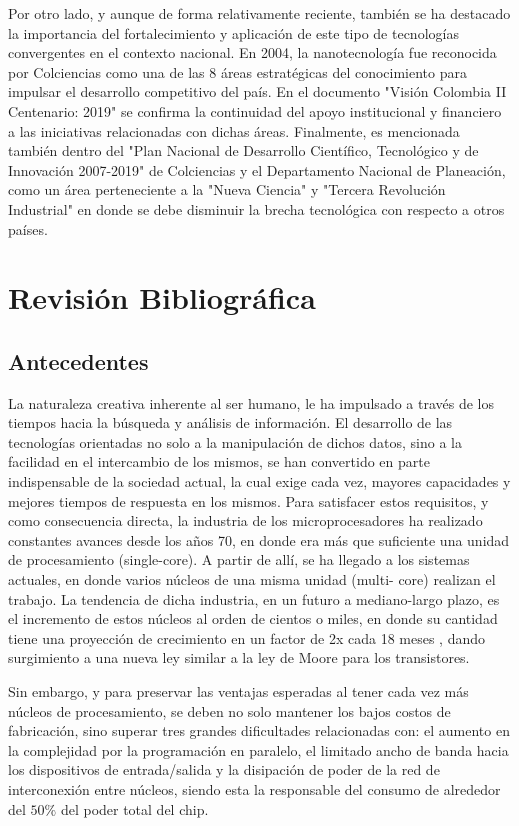 Por otro lado, y aunque de forma relativamente reciente, también se ha destacado 
la importancia del fortalecimiento y aplicación de este tipo de tecnologías convergentes 
en el contexto nacional. En 2004, la nanotecnología fue reconocida por Colciencias como
una de las 8 áreas estratégicas del conocimiento para impulsar el desarrollo 
competitivo del país. En el documento "Visión Colombia II Centenario: 2019" 
se confirma la continuidad del apoyo institucional y financiero 
a las iniciativas relacionadas con dichas áreas. 
Finalmente, es mencionada también dentro del 
"Plan Nacional de Desarrollo Científico, Tecnológico y de Innovación 2007-2019" 
de Colciencias y el Departamento Nacional de Planeación, 
como un área perteneciente a la "Nueva Ciencia" y "Tercera Revolución Industrial" 
en donde se debe disminuir la brecha tecnológica con respecto a otros países.

\section{Revisión Bibliográfica}
\subsection*{Antecedentes}
La naturaleza creativa inherente al ser humano, le ha impulsado a través de los tiempos
hacia la búsqueda y análisis de información. El desarrollo de las tecnologías orientadas
no solo a la manipulación de dichos datos, sino a la facilidad en el intercambio de los
mismos, se han convertido en parte indispensable de la sociedad actual, la cual exige
cada vez, mayores capacidades y mejores tiempos de respuesta en los mismos.
Para satisfacer estos requisitos, y como consecuencia directa, la industria de los
microprocesadores ha realizado constantes avances desde los años 70, en donde era
más que suficiente una unidad de procesamiento (single-core). A partir de allí, se ha
llegado a los sistemas actuales, en donde varios núcleos de una misma unidad (multi-
core) realizan el trabajo. La tendencia de dicha industria, en un futuro a mediano-largo
plazo, es el incremento de estos núcleos al orden de cientos o miles, en donde su
cantidad tiene una proyección de crecimiento en un factor de 2x cada 18 meses \cite{Magen2004},
dando surgimiento a una nueva ley similar a la ley de Moore para los transistores.

Sin embargo, y para preservar las ventajas esperadas al tener cada vez más núcleos de
procesamiento, se deben no solo mantener los bajos costos de fabricación, sino superar
tres grandes dificultades \cite{Asanovic2007} relacionadas con: el aumento en la 
complejidad por la programación en paralelo, el limitado ancho de banda hacia los dispositivos de
entrada/salida y la disipación de poder de la red de interconexión entre núcleos, siendo
esta la responsable del consumo de alrededor del $50\%$ \cite{Bergman2007} del 
poder total del chip.

